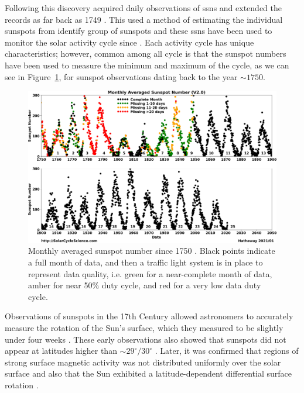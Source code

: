 Following this discovery \citet{wolf_extract_1859} acquired daily observations of \glspl{ssn} and extended the records as far back as 1749 \citep{hathaway_solar_2015}. This used a method of estimating the individual sunspots from identify group of sunspots and these \glspl{ssn} have been used to monitor the solar activity cycle since \citep{wolf_extract_1859, wolf_abstract_1861}. Each activity cycle has unique characteristics; however, common among all cycle is that the sunspot numbers have been used to measure the minimum and maximum of the cycle, as we can see in Figure~\ref{fig:ssn}, for sunspot observations dating back to the year $\sim1750$.

\begin{figure}[ht!]
	\centering
	\includegraphics[width=\columnwidth]{SSN_monthly_landscape.png}
	\caption{Monthly averaged sunspot number since 1750 \citep{hathaway_solar_2017}. Black points indicate a full month of data, and then a traffic light system is in place to represent data quality, i.e. green for a near-complete month of data, amber for near 50\% duty cycle, and red for a very low data duty cycle.}
	\label{fig:ssn}
\end{figure}

Observations of sunspots in the 17th Century allowed astronomers to accurately measure the rotation of the Sun's surface, which they measured to be slightly under four weeks \citep{casanovas_early_1997, casas_solar_2006, luminet_reception_2017}. These early observations also showed that sunspots did not appear at latitudes higher than $\sim29^{\circ}/30^{\circ}$ \citep{casanovas_early_1997}. Later, it was confirmed that regions of strong surface magnetic activity was not distributed uniformly over the solar surface and also that the Sun exhibited a latitude-dependent differential surface rotation \citep{lee_cyril_1858}. %

